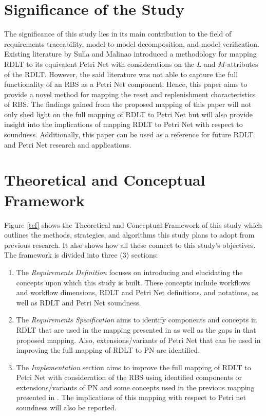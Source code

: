 \documentclass[12pt]{article}
\begin{document}
\section{Significance of the Study}
The significance of this study lies in its main contribution to the field of requirements traceability, model-to-model decomposition, and model verification. Existing literature by Sulla and Malinao \cite{sulla-malinao} introduced a methodology for mapping RDLT to its equivalent Petri Net with considerations on the $L$ and $M$-attributes of the RDLT. However, the said literature was not able to capture the full functionality of an RBS as a Petri Net component. Hence, this paper aims to provide a novel method for mapping the reset and replenishment characteristics of RBS. The findings gained from the proposed mapping of this paper will not only shed light on the full mapping of RDLT to Petri Net but will also provide insight into the implications of mapping RDLT to Petri Net with respect to soundness. Additionally, this paper can be used as a reference for future RDLT and Petri Net research and applications.

\section{Theoretical and Conceptual Framework}
Figure \ref{tcf} shows the Theoretical and Conceptual Framework of this study which outlines the methods, strategies, and algorithms this study plans to adopt from previous research. It also shows how all these connect to this study's objectives. The framework is divided into three (3) sections:

    \begin{enumerate}
        \item The \textit{Requirements Definition} focuses on introducing and elucidating the concepts upon which this study is built. These concepts include workflows and workflow dimensions, RDLT and Petri Net definitions, and notations, as well as RDLT and Petri Net soundness.
        \item The \textit{Requirements Specification} aims to identify components and concepts in RDLT that are used in the mapping presented in \cite{sulla-malinao} as well as the gaps in that proposed mapping. Also, extensions/variants of Petri Net that can be used in improving the full mapping of RDLT to PN are identified.
        \item The \textit{Implementation} section aims to improve the full mapping of RDLT to Petri Net with consideration of the RBS using identified components or extensions/variants of PN and some concepts used in the previous mapping presented in \cite{sulla-malinao}. The implications of this mapping with respect to Petri net soundness will also be reported.
    \end{enumerate}
\end{document}
